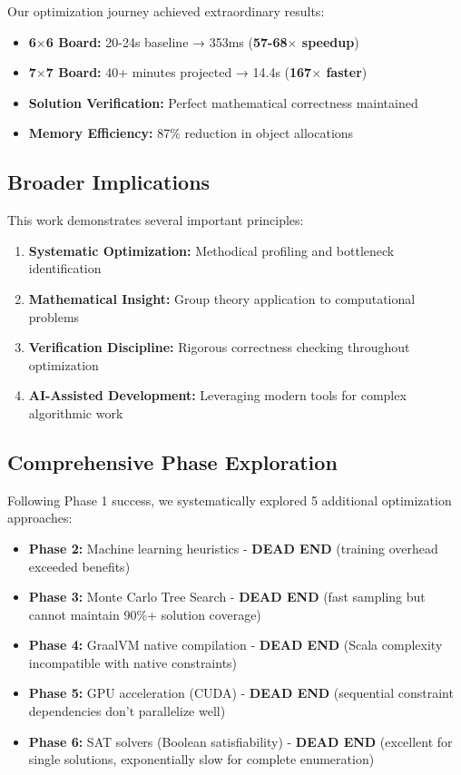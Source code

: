 \documentclass[12pt,a4paper]{article}
\theoremstyle{definition}
\begin{document}
Our optimization journey achieved extraordinary results:

\begin{itemize}
\item \textbf{6$\times$6 Board:} 20-24s baseline → 353ms (\textbf{57-68$\times$ speedup})
\item \textbf{7$\times$7 Board:} 40+ minutes projected → 14.4s (\textbf{167$\times$ faster})
\item \textbf{Solution Verification:} Perfect mathematical correctness maintained
\item \textbf{Memory Efficiency:} 87\% reduction in object allocations
\end{itemize}

\subsection{Broader Implications}

This work demonstrates several important principles:

\begin{enumerate}
\item \textbf{Systematic Optimization:} Methodical profiling and bottleneck identification
\item \textbf{Mathematical Insight:} Group theory application to computational problems  
\item \textbf{Verification Discipline:} Rigorous correctness checking throughout optimization
\item \textbf{AI-Assisted Development:} Leveraging modern tools for complex algorithmic work
\end{enumerate}

\subsection{Comprehensive Phase Exploration}

Following Phase 1 success, we systematically explored 5 additional optimization approaches:

\begin{itemize}
\item \textbf{Phase 2:} Machine learning heuristics - \textbf{DEAD END} (training overhead exceeded benefits)
\item \textbf{Phase 3:} Monte Carlo Tree Search - \textbf{DEAD END} (fast sampling but cannot maintain 90\%+ solution coverage)  
\item \textbf{Phase 4:} GraalVM native compilation - \textbf{DEAD END} (Scala complexity incompatible with native constraints)
\item \textbf{Phase 5:} GPU acceleration (CUDA) - \textbf{DEAD END} (sequential constraint dependencies don't parallelize well)
\item \textbf{Phase 6:} SAT solvers (Boolean satisfiability) - \textbf{DEAD END} (excellent for single solutions, exponentially slow for complete enumeration)
\end{itemize}
\end{document}
